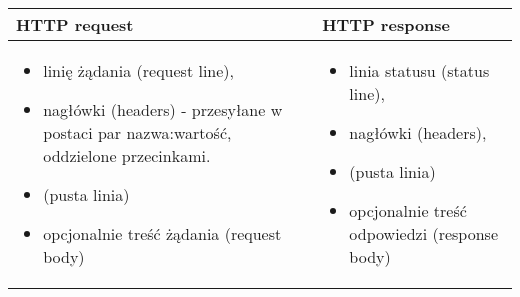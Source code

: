 \documentclass[../main.tex]{subfiles}
\begin{document}
    \begin{table}[H]
        \begin{center}
            \begin{tabular}{|p{8cm}|p{8cm}|}
                \hline
                \textbf{HTTP request} & \textbf{HTTP response}\\
                \hline
                \hline
                \begin{itemize}
                    \item linię żądania (request line),
                    \item nagłówki (headers) - przesyłane w postaci par nazwa:wartość, oddzielone przecinkami.
                    \item (pusta linia)
                    \item opcjonalnie treść żądania (request body)
                \end{itemize}
                &
                \begin{itemize}
                    \item linia statusu (status line),
                    \item nagłówki (headers),
                    \item (pusta linia)
                    \item opcjonalnie treść odpowiedzi (response body)
                \end{itemize}
                \\
                \hline
            \end{tabular}
        \end{center}
    \end{table}
\end{document}
